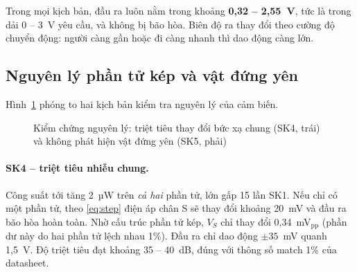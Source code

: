 Trong mọi kịch bản, đầu ra luôn nằm trong khoảng \textbf{0,32 -- 2,55~V}, tức là trong dải 0 -- 3~V yêu cầu, và không bị bão hòa. Biên độ ra thay đổi theo cường độ chuyển động: người càng gần hoặc đi càng nhanh thì dao động càng lớn.

\subsection{Nguyên lý phần tử kép và vật đứng yên}
\label{sec:kq-sk45}

Hình~\ref{fig:sk45} phóng to hai kịch bản kiểm tra nguyên lý của cảm biến.

\begin{figure}[!htb]
\centering
{}
\caption{Kiểm chứng nguyên lý: triệt tiêu thay đổi bức xạ chung (SK4, trái) và không phát hiện vật đứng yên (SK5, phải)}
\label{fig:sk45}
\end{figure}

\paragraph{SK4 -- triệt tiêu nhiễu chung.} Công suất tới tăng 2~µW trên \emph{cả hai} phần tử, lớn gấp 15 lần SK1. Nếu chỉ có một phần tử, theo \eqref{eq:step} điện áp chân S sẽ thay đổi khoảng 20~mV và đầu ra bão hòa hoàn toàn. Nhờ cấu trúc phần tử kép, $V_S$ chỉ thay đổi 0,34~mV$_\text{pp}$ (phần dư này do hai phần tử lệch nhau 1\%). Đầu ra chỉ dao động $\pm 35$~mV quanh 1,5~V. Độ triệt tiêu đạt khoảng 35 -- 40~dB, đúng với thông số match 1\% của datasheet.

